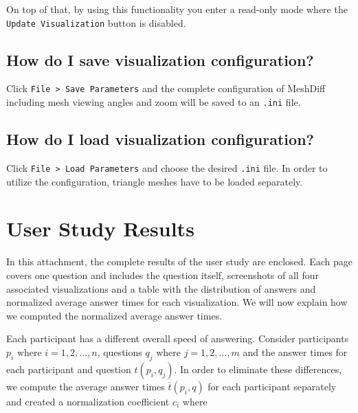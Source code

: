 On top of that, by using this functionality you enter a read-only mode where the \verb+Update Visualization+ button is disabled.

\subsection{How do I save visualization configuration?}
\label{attch:user_doc-save_config}

Click \verb+File > Save Parameters+ and the complete configuration of MeshDiff including mesh viewing angles and zoom will be saved to an \verb+.ini+ file.

\subsection{How do I load visualization configuration?}
\label{attch:user_doc-load_config}

Click \verb+File > Load Parameters+ and choose the desired \verb+.ini+ file. In order to utilize the configuration, triangle meshes have to be loaded separately.

\section{User Study Results}
\label{attch:complete_study_results}

In this attachment, the complete results of the user study are enclosed. Each page covers one question and includes the question itself, screenshots of all four associated visualizations and a table with the distribution of answers and normalized average answer times for each visualization. We will now explain how we computed the normalized average answer times.

Each participant has a different overall speed of answering. Consider participants \(p_i \text{ where } i = 1, 2, \dotsc, n\), questions \(q_j \text{ where } j = 1, 2, \dotsc, m\) and the answer times for each participant and question \(t(p_i,q_j)\). In order to eliminate these differences, we compute the average answer times \(\overline{t}(p_i,q)\) for each participant separately and created a normalization coefficient \(c_i\) where


